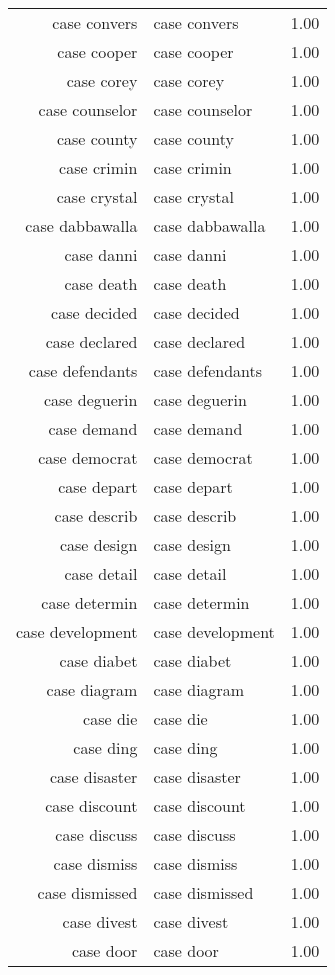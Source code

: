 \begin{table}[ht]
\begin{tabular}{rlr}
  case convers & case convers & 1.00 \\ 
  case cooper & case cooper & 1.00 \\ 
  case corey & case corey & 1.00 \\ 
  case counselor & case counselor & 1.00 \\ 
  case county & case county & 1.00 \\ 
  case crimin & case crimin & 1.00 \\ 
  case crystal & case crystal & 1.00 \\ 
  case dabbawalla & case dabbawalla & 1.00 \\ 
  case danni & case danni & 1.00 \\ 
  case death & case death & 1.00 \\ 
  case decided & case decided & 1.00 \\ 
  case declared & case declared & 1.00 \\ 
  case defendants & case defendants & 1.00 \\ 
  case deguerin & case deguerin & 1.00 \\ 
  case demand & case demand & 1.00 \\ 
  case democrat & case democrat & 1.00 \\ 
  case depart & case depart & 1.00 \\ 
  case describ & case describ & 1.00 \\ 
  case design & case design & 1.00 \\ 
  case detail & case detail & 1.00 \\ 
  case determin & case determin & 1.00 \\ 
  case development & case development & 1.00 \\ 
  case diabet & case diabet & 1.00 \\ 
  case diagram & case diagram & 1.00 \\ 
  case die & case die & 1.00 \\ 
  case ding & case ding & 1.00 \\ 
  case disaster & case disaster & 1.00 \\ 
  case discount & case discount & 1.00 \\ 
  case discuss & case discuss & 1.00 \\ 
  case dismiss & case dismiss & 1.00 \\ 
  case dismissed & case dismissed & 1.00 \\ 
  case divest & case divest & 1.00 \\ 
  case door & case door & 1.00 \\ 

\end{tabular}
\end{table}
